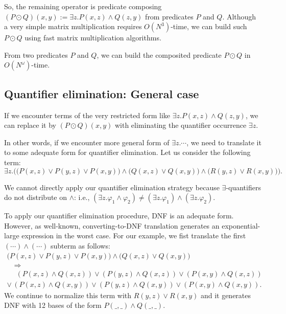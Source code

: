 \documentclass[a4paper,UKenglish,cleveref, autoref, thm-restate]{lipics-v2021}
\begin{document}
So, the remaining operator is predicate composing $(P \odot Q)(x, y) := \exists z. P(x, z) \land Q(z, y)$ from predicates $P$ and $Q$.
Although a very simple matrix multiplication requires $O(N^3)$-time,
we can build such $P \odot Q$ using fast matrix multiplication algorithms.
\begin{proposition}[Fact]
From two predicates $P$ and $Q$, we can build the composited predicate $P \odot Q$ in $O(N^\omega)$-time.
\end{proposition}

\subsection{Quantifier elimination: General case}

If we encounter terms of the very restricted form like $\exists z. P(x, z) \land Q(z, y)$,
we can replace it by $(P \odot Q)(x, y)$ with eliminating the quantifier occurrence $\exists z$.

In other words, if we encounter more general form of $\exists z. \cdots$, we need to translate it to some adequate form for quantifier elimination.
%
Let us consider the following term:
$$
\exists z. \biggl(
\bigl(P(x, z) \lor P(y, z) \lor P(x, y) \bigr)
\land
\bigl(Q(x, z) \lor Q(x, y)\bigr)
\land
\bigl(R(y, z) \lor R(x, y)\bigr)
\biggr).
$$

We cannot directly apply our quantifier elimination strategy because $\exists$-quantifiers do not distribute on $\land$: i.e.,
$(\exists z. \varphi_1 \land \varphi_2) \neq (\exists z. \varphi_1) \land (\exists z. \varphi_2)$.

To apply our quantifier elimination procedure, DNF is an adequate form.
However, as well-known, converting-to-DNF translation generates an exponential-large expression in the worst case.
For our example, we fist translate the first $(\cdots) \land (\cdots)$ subterm as follows:
$$
\begin{array}{l}
\bigl(P(x, z) \lor P(y, z) \lor P(x, y) \bigr)
\land
\bigl(Q(x, z) \lor Q(x, y)\bigr) \\
\quad \Rightarrow \\
\phantom{\lor}\,
(P(x, z) \land Q(x,z)) \lor
(P(y, z) \land Q(x,z)) \lor
(P(x, y) \land Q(x, z)) \\
\lor\,
(P(x, z) \land Q(x, y)) \lor
(P(y, z) \land Q(x, y)) \lor
(P(x, y) \land Q(x, y)).
\end{array}
$$
We continue to normalize this term with $R(y, z) \lor R(x, y)$
and it generates DNF with 12 bases of the form $P(\_, \_) \land Q(\_, \_)$.
\end{document}
